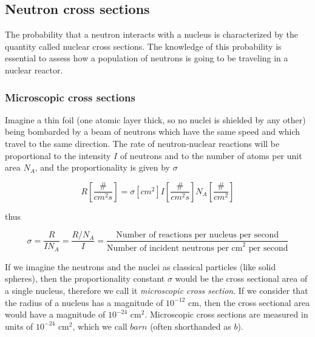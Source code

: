 \subsection{Neutron cross sections}

The probability that a neutron interacts with a nucleus is characterized by the quantity called nuclear cross sections. The knowledge of this probability is essential to assess how a population of neutrons is going to be traveling in a nuclear reactor. 

\subsubsection{Microscopic cross sections}

Imagine a thin foil (one atomic layer thick, so no nuclei is shielded by any other) being bombarded by a beam of neutrons which have the same speed and which travel to the same direction. The rate of neutron-nuclear reactions will be proportional to the intensity $I$ of neutrons and to the number of atoms per unit area $N_A$, and the proportionality is given by $\sigma$


\begin{equation}
R[\frac{\#}{cm^2s}]=\sigma [cm^2] I [\frac{\#}{cm^2s}] N_A [\frac{\#}{cm^2}]
\end{equation}

thus

\begin{equation}\label{eq:sigma}
\sigma=\frac{R}{IN_A}=\frac{R/N_A}{I}=\frac{\text{Number of reactions per nucleus per second}}{\text{Number of incident neutrons per cm}^2\text{ per second}}
\end{equation}

If we imagine the neutrons and the nuclei as classical particles (like solid spheres), then the proportionality constant $\sigma$ would be the cross sectional area of a single nucleus, therefore we call it \textit{microscopic cross section}. If we consider that the radius of a nucleus has a magnitude of $10^{-12}$ cm, then the cross sectional area would have a magnitude of $10^{-24}$ cm$^2$. Microscopic cross sections are measured in units of $10^{-24}$ cm$^2$, which we call $barn$ (often shorthanded as $b$).

